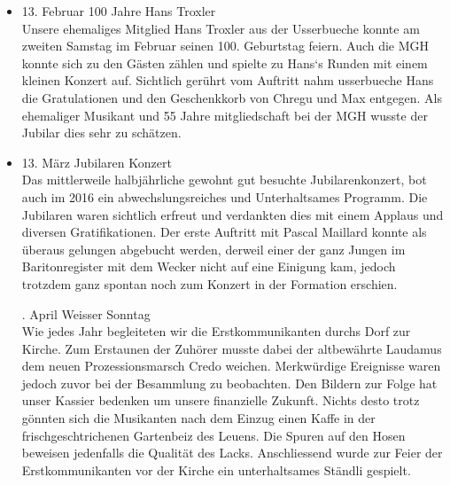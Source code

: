 \begin{history}
\begin{itemize}
            \item 13. Februar 100 Jahre Hans Troxler\\
                  Unsere ehemaliges Mitglied Hans Troxler aus der Usserbueche
                  konnte am zweiten Samstag im Februar seinen 100. Geburtstag
                  feiern. Auch die MGH konnte sich zu den Gästen zählen und
                  spielte zu Hans`s Runden  mit einem kleinen Konzert auf.
                  Sichtlich gerührt vom Auftritt nahm usserbueche Hans die
                  Gratulationen und den Geschenkkorb von Chregu und Max
                  entgegen. Als ehemaliger Musikant und 55 Jahre mitgliedschaft
                  bei der MGH wusste der Jubilar dies sehr zu schätzen.

            \item 13. März Jubilaren Konzert\\
                  Das mittlerweile halbjährliche gewohnt gut besuchte
                  Jubilarenkonzert, bot auch im 2016 ein abwechslungsreiches und
                  Unterhaltsames Programm. Die Jubilaren waren sichtlich erfreut
                  und verdankten dies mit einem Applaus und diversen
                  Gratifikationen. Der erste Auftritt mit Pascal Maillard konnte
                  als überaus gelungen abgebucht werden, derweil einer der ganz
                  Jungen im Baritonregister mit dem Wecker nicht auf eine
                  Einigung kam, jedoch trotzdem ganz spontan noch zum Konzert in
                  der Formation erschien.

                  . April Weisser Sonntag\\
                  Wie jedes Jahr begleiteten wir die Erstkommunikanten durchs
                  Dorf zur Kirche. Zum Erstaunen der Zuhörer musste dabei der
                  altbewährte Laudamus dem neuen Prozessionsmarsch Credo
                  weichen. Merkwürdige Ereignisse waren jedoch zuvor bei der
                  Besammlung zu beobachten. Den Bildern zur Folge hat unser
                  Kassier bedenken um unsere finanzielle Zukunft. Nichts desto
                  trotz gönnten sich die Musikanten nach dem Einzug einen Kaffe
                  in der frischgeschtrichenen Gartenbeiz des Leuens. Die Spuren
                  auf den Hosen beweisen jedenfalls die Qualität des Lacks.
                  Anschliessend wurde zur Feier der Erstkommunikanten vor der
                  Kirche ein unterhaltsames Ständli gespielt.


\end{itemize}
\end{history}
